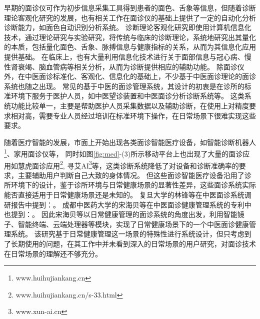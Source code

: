 早期的面诊仪可作为初步信息采集工具得到患者的面色、舌象等信息，但随着诊断理论客观化研究的发展，也有相关工作在面诊仪的基础上提供了一定的自动化分析诊断能力，如面色自动识别分析系统\cite{崔骥2018人工智能背景下中医诊疗技术的应用与展望}。
诊断理论客观化研究即使用计算机信息化技术，通过理论研究与实验研究，将传统与临床的诊断理论，系统地研究出其量化的本质，包括量化面色、舌象、脉搏信息与健康指标的关系，从而为其信息化应用提供基础\cite{Wang2013TCM, guo2015analysis, li2020tcminet}。
在临床上，也有大量利用信息化技术进行关于面部信息与冠心病、慢性肾衰竭、脑血管病等相关分析，从而为诊断提供相应的辅助功能\cite{崔骥2018人工智能背景下中医诊疗技术的应用与展望}。
除面诊仪外，在中医面诊标准化、客观化、信息化的基础上，不少基于中医面诊理论的面诊系统也随之出现。
常见的基于中医的面诊管理系统，其设计的初衷是在诊所的标准环境下服务于医护人员，如中医望诊装置\cite{李国正0一种用于中医望诊的三维图像采集装置}和中医面诊分析诊断系统等\cite{李福凤2016中医面诊分析与诊断系统}。
这类系统功能比较单一，主要是帮助医护人员采集数据以及辅助诊断，在使用上对精度要求相对高，需要专业人员经过培训在标准环境下操作，在日常场景下很难实现这些要求。

随着医疗智能的发展，市面上开始出现各类面诊智能医疗设备，如智能诊断机器人\footnote{www.huihujiankang.cn}、家用面诊仪等，
同时如图\ref{fig:med}-(3)所示移动平台上也出现了大量的面诊应用如慧虎面诊应用\footnote{www.huihujiankang.cn/s-33.html}, 寻艾AI\footnote{www.xun-ai.cn}等，这类诊断系统降低了对设备和诊断准确率的要求，主要辅助用户判断自己大致的身体情况。
但这些面诊智能医疗设备沿用了诊所环境下的设计，鉴于诊所环境与日常健康场景的显著性差异，这些面诊系统实际能否直接适用于日常健康场景还是未知的。
复旦大学的林锋\cite{林锋2019中医面诊系统调研报告}等在中医面诊系统调研报告中提到：。
成都中医药大学的宋海贝\cite{宋海贝2019中医面诊健康管理系统}等在中医面诊健康管理系统的专利中也提到：。
因此宋海贝等以日常健康管理的面诊系统的角度出发，利用智能镜子、智能终端、云端处理器等模块，实现了日常健康场景下的一个中医面诊健康管理系统。
该研究基于日常健康管理这一场景的特殊性进行系统设计，但只考虑到了长期使用的问题，在其工作中并未看到深入的日常场景的用户研究，对面诊技术在日常场景的理解还不够充分。

